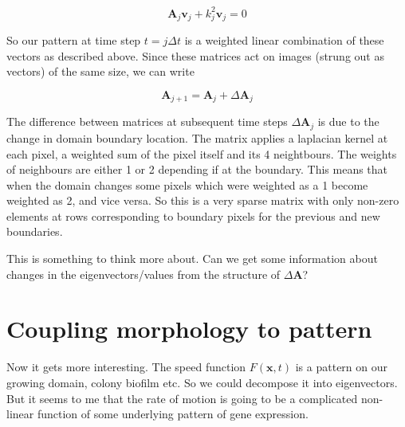 \documentclass{report}
\renewcommand{\vec}[1]{\mathbf{#1}}
\newcommand{\mat}{\mathbf}
\begin{document}
\begin{equation}
\mat{A}_j \vec{v}_j + k_j^2 \vec{v}_j = 0
\end{equation}

So our pattern at time step $t=j\Delta t$ is a weighted linear combination of
these vectors as described above.
Since these matrices act on images (strung out as vectors) of the same size, we
can write

\begin{equation}
\mat{A}_{j+1} = \mat{A}_{j} + \Delta\mat{A}_j
\end{equation}

The difference between matrices at subsequent time steps $\Delta\mat{A}_j$ is
due to the change in domain boundary location. The matrix applies a laplacian
kernel at each pixel, a weighted sum of the pixel itself and its 4 neightbours.
The weights of neighbours are either 1 or 2 depending if at the boundary.
This means that when the domain changes some pixels which were weighted as a 1
become weighted as 2, and vice versa. So this is a very sparse matrix with only
non-zero elements at rows corresponding to boundary pixels for the previous and
new boundaries.

This is something to think more about. Can we get some information about changes
in the eigenvectors/values from the structure of $\Delta\mat{A}$?

\begin{comment}
We can also just directly think about a time varying matrix, eigenvector and
eigenvalue $\mat{A}(t)v(t) = k(t)^2 v(t)$. And 

\begin{equation}
(\mat{A}(t) + k(t)^2\mat{I}) v(t) = 0
\end{equation}

differentiate both sides

\begin{equation}
\left( \frac{\partial\mat{A}}{\partial t} + 2k\frac{\partial k}{\partial t}
\mat{I} \right) v 
+
(\mat{A}(t) + k(t)^2\mat{I}) \frac{\partial v}{\partial t}
\end{equation}

\end{comment}

\section{Coupling morphology to pattern}
Now it gets more interesting. The speed function $F(\vec{x},t)$ is
a pattern on our growing domain, colony biofilm etc. So we could decompose it into
eigenvectors. But it seems to me that the rate of motion is going to be a
complicated non-linear function of some underlying pattern of gene expression.
\end{document}
